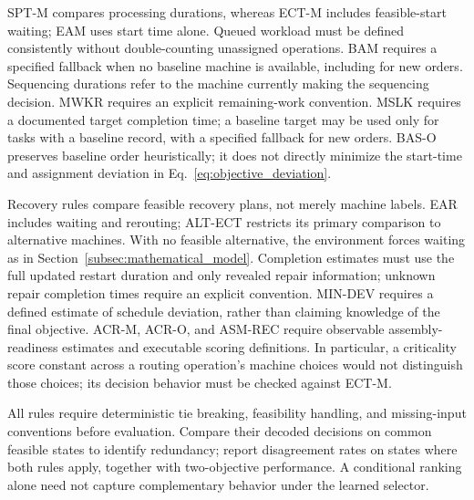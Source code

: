 SPT-M compares processing durations, whereas ECT-M includes feasible-start waiting; EAM uses
start time alone. Queued workload must be defined consistently without double-counting unassigned
operations. BAM requires a specified fallback when no baseline machine is available, including for
new orders. Sequencing durations refer to the machine currently making the sequencing decision.
MWKR requires an explicit remaining-work convention. MSLK requires a documented target completion
time; a baseline target may be used only for tasks with a baseline record, with a specified fallback
for new orders. BAS-O preserves baseline order heuristically; it does not directly minimize the
start-time and assignment deviation in Eq.~\eqref{eq:objective_deviation}.

Recovery rules compare feasible recovery plans, not merely machine labels. EAR includes waiting
and rerouting; ALT-ECT restricts its primary comparison to alternative machines. With no feasible
alternative, the environment forces waiting as in Section~\ref{subsec:mathematical_model}.
Completion estimates must use the full updated restart duration and only revealed repair information;
unknown repair completion times require an explicit convention. MIN-DEV requires a defined estimate
of schedule deviation, rather than claiming knowledge of the final objective. ACR-M, ACR-O, and
ASM-REC require observable assembly-readiness estimates and executable scoring definitions.
In particular, a criticality score constant across a routing operation's machine choices would not
distinguish those choices; its decision behavior must be checked against ECT-M.

All rules require deterministic tie breaking, feasibility handling, and missing-input conventions
before evaluation. Compare their decoded decisions on common feasible states to identify redundancy;
report disagreement rates on states where both rules apply, together with two-objective performance.
A conditional ranking alone need not capture complementary behavior under the learned selector.

